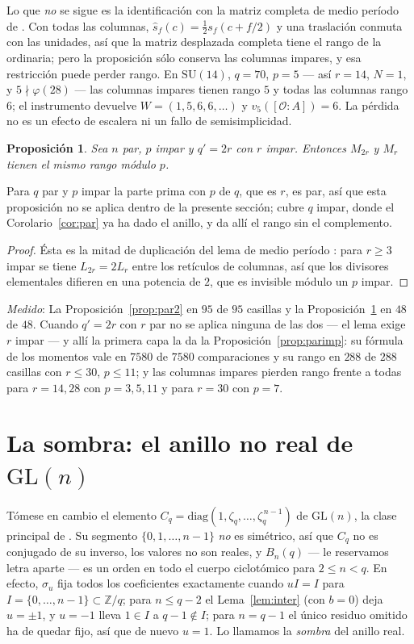 \documentclass[11pt,a4paper]{article}
\newtheorem{proposition}[theorem]{Proposici\'on}
\theoremstyle{definition}
\newcommand{\SU}{\mathrm{SU}}
\newcommand{\GL}{\mathrm{GL}}
\newcommand{\ZZ}{\mathbb{Z}}
\newcommand{\cO}{\mathcal{O}}
\newcommand{\medido}[1]{\emph{Medido}: #1}
\begin{document}
\noindent Lo que \emph{no} se sigue es la identificaci\'on con la matriz completa de medio per\'iodo
de \cite{Cond}. Con todas las columnas, $\widehat s_f(c)=\tfrac12 s_f(c+f/2)$ y una traslaci\'on
conmuta con las unidades, as\'i que la matriz desplazada completa tiene el rango de la ordinaria; pero
la proposici\'on s\'olo conserva las columnas impares, y esa restricci\'on puede perder rango. En
$\SU(14)$, $q=70$, $p=5$ --- as\'i $r=14$, $N=1$, y $5\nmid\varphi(28)$ --- las columnas impares
tienen rango $5$ y todas las columnas rango $6$; el instrumento devuelve $W=(1,5,6,6,\dots)$ y
$v_5([\cO:A])=6$. La p\'erdida no es un efecto de escalera ni un fallo de semisimplicidad.

\begin{proposition}\label{prop:par1}
Sea $n$ par, $p$ impar y $q'=2r$ con $r$ impar. Entonces $M_{2r}$ y $M_r$ tienen el mismo rango
m\'odulo $p$.
\end{proposition}

\noindent Para $q$ par y $p$ impar la parte prima con $p$ de $q$, que es $r$, es par, as\'i que
esta proposici\'on no se aplica dentro de la presente secci\'on; cubre $q$ impar, donde el
Corolario~\ref{cor:par} ya ha dado el anillo, y da all\'i el rango sin el complemento.

\begin{proof}
\'Esta es la mitad de duplicaci\'on del lema de medio per\'iodo \cite[Lem.~14]{Cond}: para $r\ge3$
impar se tiene $L_{2r}=2L_r$ entre los ret\'iculos de columnas, as\'i que los divisores elementales
difieren en una potencia de $2$, que es invisible m\'odulo un $p$ impar.
\end{proof}

\medido{La Proposici\'on~\ref{prop:par2} en $95$ de $95$ casillas y la
Proposici\'on~\ref{prop:par1} en $48$ de $48$. Cuando $q'=2r$ con $r$ par no se aplica ninguna de
las dos --- el lema exige $r$ impar --- y all\'i la primera capa la da la Proposici\'on~\ref{prop:parimp}: su f\'ormula de los momentos vale en
$7580$ de $7580$ comparaciones y su rango en $288$ de $288$ casillas con $r\le30$, $p\le11$; y las
columnas impares pierden rango frente a todas para $r=14,28$ con $p=3,5,11$ y para $r=30$ con
$p=7$.}

\section{La sombra: el anillo no real de \texorpdfstring{$\GL(n)$}{GL(n)}}\label{sec:sombra}

T\'omese en cambio el elemento $C_q=\mathrm{diag}(1,\zeta_q,\dots,\zeta_q^{\,n-1})$ de $\GL(n)$, la
clase principal de \cite{NPP}. Su segmento $\{0,1,\dots,n-1\}$ \emph{no} es sim\'etrico, as\'i que
$C_q$ no es conjugado de su inverso, los valores no son reales, y $B_n(q)$ --- le reservamos letra
aparte --- es un orden en todo el cuerpo ciclot\'omico para $2\le n<q$. En efecto, $\sigma_u$ fija todos
los coeficientes exactamente cuando $uI=I$ para $I=\{0,\dots,n-1\}\subset\ZZ/q$; para $n\le q-2$
el Lema~\ref{lem:inter} (con $b=0$) deja $u=\pm1$, y $u=-1$ lleva $1\in I$ a $q-1\notin I$; para
$n=q-1$ el \'unico residuo omitido ha de quedar fijo, as\'i que de nuevo $u=1$. Lo llamamos la \emph{sombra} del anillo real.
\end{document}
